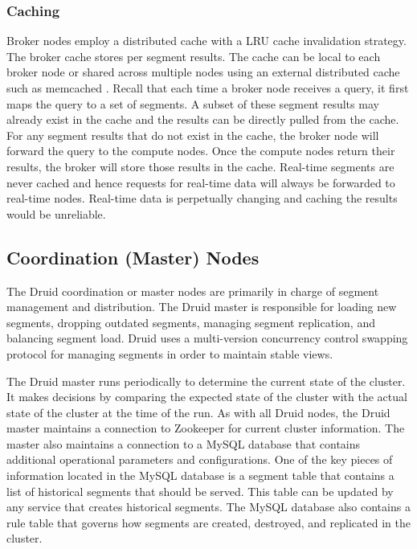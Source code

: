 \documentclass{vldb}
\begin{document}
\subsubsection{Caching}
\label{sec:caching}
Broker nodes employ a distributed cache with a LRU \cite{o1993lru,
kim2001lrfu} cache invalidation strategy. The broker cache stores
per segment results. The cache can be local to each broker node or
shared across multiple nodes using an external distributed cache
such as memcached \cite{fitzpatrick2004distributed}. Recall that each time a broker node receives a
query, it first maps the query to a set of segments. A subset of
these segment results may already exist in the cache and the results
can be directly pulled from the cache. For any segment results that
do not exist in the cache, the broker node will forward the query
to the compute nodes. Once the compute nodes return their results,
the broker will store those results in the cache. Real-time segments
are never cached and hence requests for real-time data will always
be forwarded to real-time nodes. Real-time data is perpetually
changing and caching the results would be unreliable.


\subsection{Coordination (Master) Nodes}
The Druid coordination or master nodes are primarily in charge of
segment management and distribution. The Druid master is responsible
for loading new segments, dropping outdated segments, managing segment
replication, and balancing segment load. Druid uses a multi-version
concurrency control swapping protocol for managing segments in order
to maintain stable views.

The Druid master runs periodically to determine the current state of
the cluster. It makes decisions by comparing the expected state of the
cluster with the actual state of the cluster at the time of the
run. As with all Druid nodes, the Druid master maintains a connection
to Zookeeper for current cluster information. The master also
maintains a connection to a MySQL database that contains additional
operational parameters and configurations. One of the key pieces of
information located in the MySQL database is a segment table that
contains a list of historical segments that should be served. This
table can be updated by any service that creates historical
segments. The MySQL database also contains a rule table that governs
how segments are created, destroyed, and replicated in the cluster.
\end{document}
